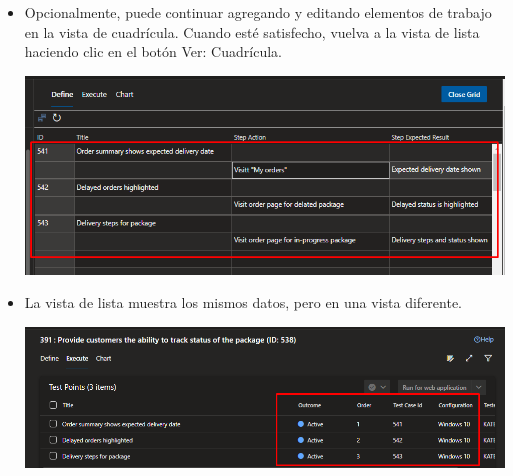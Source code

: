 \begin{itemize}
\item Opcionalmente, puede continuar agregando y editando elementos de trabajo en la vista de cuadrícula. Cuando esté satisfecho, vuelva a la vista de lista haciendo clic en el botón Ver: Cuadrícula.
\begin{center}
\includegraphics[width=\columnwidth]{images/35}\newline
\end{center}

\item La vista de lista muestra los mismos datos, pero en una vista diferente.
\begin{center}
\includegraphics[width=\columnwidth]{images/36}\newline
\end{center}


\end{itemize}
